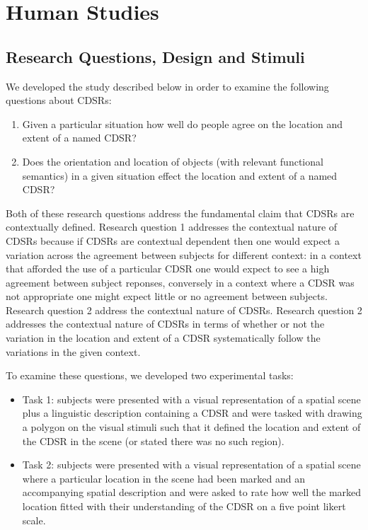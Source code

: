 \documentclass[11pt,letterpaper]{article}
\begin{document}
\section{Human Studies}

\subsection{Research Questions, Design and Stimuli}

We developed the study described below in order to examine the following questions about CDSRs:
\begin{enumerate}
	\item Given a particular situation how well do people agree on the location and extent of a named CDSR?
	\item Does the orientation and location of objects (with relevant functional semantics) in a given situation effect the location and extent of a named CDSR?
\end{enumerate}

Both of these research questions address the fundamental claim that CDSRs are contextually defined. Research question 1 addresses the contextual nature of CDSRs because if CDSRs are contextual dependent then one would expect a variation across the agreement between subjects for different context: in a context that afforded the use of a particular CDSR one would expect to see a high agreement between subject reponses, conversely in a context where a CDSR was not appropriate one might expect little or no agreement between subjects. Research question 2 address the contextual nature of CDSRs. Research question 2 addresses the contextual nature of CDSRs in terms of whether or not the variation in the location and extent of a CDSR systematically follow the variations  in the given context. 

To examine these questions, we developed two experimental tasks:
\begin{itemize}
	\item{Task 1:} subjects were presented with a visual representation of a spatial scene plus a linguistic description containing a CDSR and were tasked with drawing a polygon on the visual stimuli such that it defined the location and extent of the CDSR in the scene (or stated there was no such region).
	\item{Task 2:} subjects were presented with a visual representation of a spatial scene where a particular location in the scene had been marked and an accompanying spatial description and were asked to rate how well the marked location fitted with their understanding of the CDSR on a five point likert scale.
\end{itemize}
\end{document}
